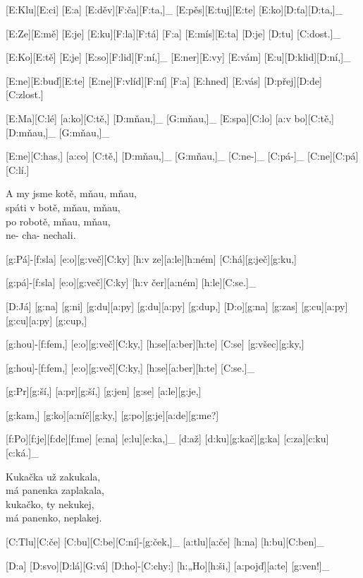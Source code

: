 [E:Klu][E:ci] [E:a] [E:děv][F:ča][F:ta,]_
[E:pěs][E:tuj][E:te] [E:ko][D:ťa][D:ta,]_

[E:Ze][E:mě] [E:je] [E:ku][F:la][F:tá] %
[F:a] [E:mís][E:ta] [D:je] [D:tu] [C:dost.]_

[E:Ko][E:tě] [E:je] [E:so][F:lid][F:ní,]_
[E:ner][E:vy] [E:vám] [E:u][D:klid][D:ní,]_

[E:ne][E:buď][E:te] [E:ne][F:vlíd][F:ní] %
[F:a] [E:hned] [E:vás] [D:přej][D:de] [C:zlost.]

[E:Ma][C:lé] [a:ko][C:tě,] [D:mňau,]_ [G:mňau,]_
[E:spa][C:lo] [a:v bo][C:tě,] [D:mňau,]_ [G:mňau,]_

[E:ne][C:has,] [a:co] [C:tě,] [D:mňau,]_ [G:mňau,]_
[C:ne-]_ [C:pá-]_ [C:ne][C:pá][C:lí.]

A my jsme kotě, mňau, mňau,\\
spáti v botě, mňau, mňau,\\
po robotě, mňau, mňau,\\
ne- cha- nechali.



[g:Pá]-[f:sla] [e:o][g:več][C:ky] [h:v ze][a:le][h:ném] [C:há][g:ječ][g:ku,] %

[g:pá]-[f:sla] [e:o][g:več][C:ky] [h:v čer][a:ném] [h:le][C:se.]_

[D:Já] [g:na] [g:ni] [g:du][a:py] [g:du][a:py] [g:dup,] %
[D:o][g:na] [g:zas] [g:cu][a:py] [g:cu][a:py] [g:cup,]

[g:hou]-[f:fem,] [e:o][g:več][C:ky,] [h:se][a:ber][h:te] [C:se] [g:všec][g:ky,] %

[g:hou]-[f:fem,] [e:o][g:več][C:ky,] [h:se][a:ber][h:te] [C:se.]_



[g:Pr][g:ší,] [a:pr][g:ší,] [g:jen] [g:se] [a:le][g:je,] %

[g:kam,] [g:ko][a:níč][g:ky,] [g:po][g:je][a:de][g:me?] %

[f:Po][f:je][f:de][f:me] [e:na] [e:lu][e:ka,]_
[d:až] [d:ku][g:kač][g:ka] [c:za][c:ku][c:ká.]_

Kukačka už zakukala,\\
má panenka zaplakala,\\
kukačko, ty nekukej,\\
má panenko, neplakej.



[C:Tlu][C:če] [C:bu][C:be][C:ní]-[g:ček,]_
[a:tlu][a:če] [h:na] [h:bu][C:ben]_

[D:a] [D:svo][D:lá][G:vá] [D:ho]-[C:chy:] %
[h:„Ho][h:ši,] [a:pojď][a:te] [g:ven!]_

